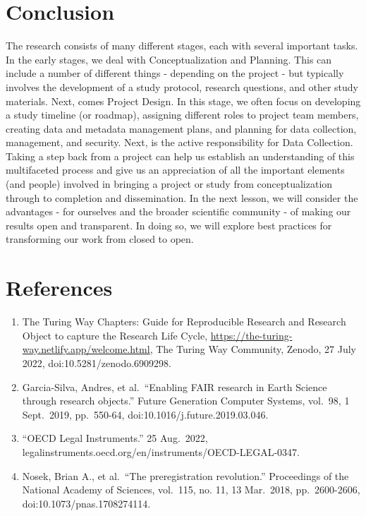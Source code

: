 \documentclass[
  letterpaper,
  DIV=11,
  numbers=noendperiod]{scrreport}
\providecommand{\tightlist}{%
  \setlength{\itemsep}{0pt}\setlength{\parskip}{0pt}}\usepackage{longtable,booktabs,array}
\begin{document}
\hypertarget{conclusion}{%
\section{Conclusion}\label{conclusion}}

The research consists of many different stages, each with several
important tasks. In the early stages, we deal with Conceptualization and
Planning. This can include a number of different things - depending on
the project - but typically involves the development of a study
protocol, research questions, and other study materials. Next, comes
Project Design. In this stage, we often focus on developing a study
timeline (or roadmap), assigning different roles to project team
members, creating data and metadata management plans, and planning for
data collection, management, and security. Next, is the active
responsibility for Data Collection. Taking a step back from a project
can help us establish an understanding of this multifaceted process and
give us an appreciation of all the important elements (and people)
involved in bringing a project or study from conceptualization through
to completion and dissemination. In the next lesson, we will consider
the advantages - for ourselves and the broader scientific community - of
making our results open and transparent. In doing so, we will explore
best practices for transforming our work from closed to open.

\hypertarget{references-7}{%
\section{References}\label{references-7}}

\begin{enumerate}
\def\labelenumi{\arabic{enumi}.}
\tightlist
\item
  The Turing Way Chapters: Guide for Reproducible Research and Research
  Object to capture the Research Life Cycle,
  \url{https://the-turing-way.netlify.app/welcome.html}, The Turing Way
  Community, Zenodo, 27 July 2022, doi:10.5281/zenodo.6909298.
\item
  Garcia-Silva, Andres, et al.~``Enabling FAIR research in Earth Science
  through research objects.'' Future Generation Computer Systems,
  vol.~98, 1 Sept.~2019, pp.~550-64, doi:10.1016/j.future.2019.03.046.
\item
  ``OECD Legal Instruments.'' 25 Aug.~2022,
  legalinstruments.oecd.org/en/instruments/OECD-LEGAL-0347.
\item
  Nosek, Brian A., et al.~``The preregistration revolution.''
  Proceedings of the National Academy of Sciences, vol.~115, no. 11, 13
  Mar.~2018, pp.~2600-2606, doi:10.1073/pnas.1708274114.
\end{enumerate}
\end{document}

